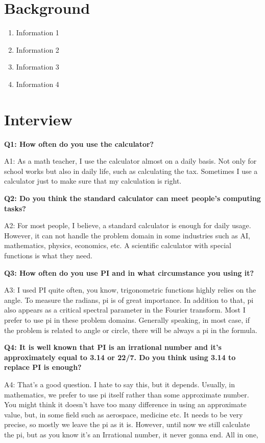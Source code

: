\documentclass[12pt,letterpaper]{article}
\begin{document}
\section*{Background}

\begin{enumerate}
  \item
  	Information 1
  \item
    Information 2

    \item Information 3

  \item Information 4

\end{enumerate}


\section*{Interview}
\textbf {Q1: How often do you use the calculator?}

A1: As a math teacher, I use the calculator almost on a daily basis. Not only for school works but also in daily life, such as calculating the tax. Sometimes I use a calculator just to make sure that my calculation is right.

\textbf {Q2: Do you think the standard calculator can meet people's computing tasks?}

A2: For most people, I believe, a standard calculator is enough for daily usage.  However, it can not handle the problem domain in some industries such as AI, mathematics, physics, economics, etc. A scientific calculator with special functions is what they need. 

\textbf {Q3: How often do you use PI and in what circumstance you using it?}

A3: I used PI quite often, you know, trigonometric functions highly relies on the angle. To measure the radians, pi is of great importance. In addition to that, pi also appears as a critical spectral parameter in the Fourier transform. Most I prefer to use pi in these problem domains. Generally speaking, in most case, if the problem is related to angle or circle, there will be always a pi in the formula.

\textbf {Q4: It is well known that PI is an irrational number and it’s approximately equal to 3.14 or 22/7. Do you think using 3.14 to replace PI is enough?}


A4: That's a good question.  I hate to say this, but it depends. Usually, in mathematics, we prefer to use pi itself rather than some approximate number. You might think it doesn't have too many difference in using an approximate value, but, in some field such as aerospace, medicine etc. It needs to be very precise, so mostly we leave the pi as it is. However, until now we still calculate the pi, but as you know it's an Irrational number, it never gonna end. All in one,  
\end{document}
